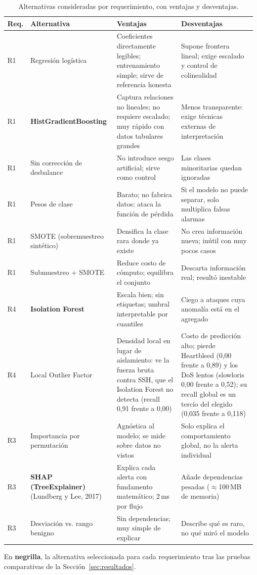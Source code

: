 \documentclass[11pt,a4paper]{article}
\begin{document}
\begin{table}[H]
\centering
\caption{Alternativas consideradas por requerimiento, con ventajas y desventajas.}
\label{tab:alternativas}
\footnotesize\setlength{\tabcolsep}{4pt}
\begin{tabular}{L{1.0cm} L{3.0cm} L{5.0cm} L{5.0cm}}
\toprule
\textbf{Req.} & \textbf{Alternativa} & \textbf{Ventajas} & \textbf{Desventajas} \\
\midrule
R1 & Regresión logística & Coeficientes directamente legibles; entrenamiento simple; sirve de referencia honesta & Supone frontera lineal; exige escalado y control de colinealidad \\
R1 & \textbf{HistGradient\-Boosting} & Captura relaciones no lineales; no requiere escalado; muy rápido con datos tabulares grandes & Menos transparente: exige técnicas externas de interpretación \\
\midrule
R1 & Sin corrección de desbalance & No introduce sesgo artificial; sirve como control & Las clases minoritarias quedan ignoradas \\
R1 & Pesos de clase & Barato; no fabrica datos; ataca la función de pérdida & Si el modelo no puede separar, solo multiplica falsas alarmas \\
R1 & SMOTE (sobremuestreo sintético) & Densifica la clase rara donde ya existe & No crea información nueva; inútil con muy pocos casos \\
R1 & Submuestreo + SMOTE & Reduce costo de cómputo; equilibra el conjunto & Descarta información real; resultó inestable \\
\midrule
R4 & \textbf{Isolation Forest} & Escala bien; sin etiquetas; umbral interpretable por cuantiles & Ciego a ataques cuya anomalía está en el agregado \\
R4 & Local Outlier Factor & Densidad local en lugar de aislamiento: ve la fuerza bruta contra SSH, que el Isolation Forest no detecta (recall 0,91 frente a 0,00) & Costo de predicción alto; pierde Heartbleed (0,00 frente a 0,89) y los DoS lentos (slowloris 0,00 frente a 0,52); su recall global es un tercio del elegido (0,035 frente a 0,118) \\
\midrule
R3 & Importancia por permutación & Agnóstica al modelo; se mide sobre datos no vistos & Solo explica el comportamiento global, no la alerta individual \\
R3 & \textbf{SHAP (TreeExplainer)} (Lundberg y Lee, 2017) & Explica cada alerta con fundamento matemático; 2\,ms por flujo & Añade dependencias pesadas ($\approx$100\,MB de memoria) \\
R3 & Desviación vs. rango benigno & Sin dependencias; muy simple de explicar & Describe qué es raro, no qué miró el modelo \\
\bottomrule
\end{tabular}

\vspace{0.15cm}
{\footnotesize\noindent En \textbf{negrilla}, la alternativa seleccionada
para cada requerimiento tras las pruebas comparativas de la
Sección~\ref{sec:resultados}.}
\end{table}
\end{document}
